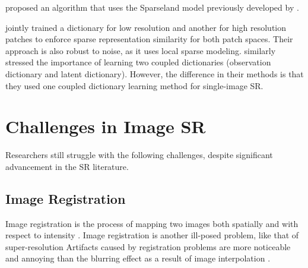 \cite{Zeyde2012} proposed an algorithm that uses the Sparseland model previously developed by \cite{Elad2006}. 

\cite{Wright2010} jointly trained a dictionary for low resolution and another for high resolution patches to enforce sparse representation similarity for both patch spaces. Their approach is also robust to noise, as it uses local sparse modeling.
\cite{Yang2012} similarly stressed the importance of learning two coupled dictionaries (observation dictionary and latent dictionary). However, the difference in their methods is that they used one coupled dictionary learning method for single-image SR. 	


%



\section{Challenges in Image SR}
Researchers still struggle with the following challenges, despite significant advancement in the SR literature.


\subsection{Image Registration}
Image registration is the process of mapping two images both spatially and with respect to intensity \citep{Brown1992}.
Image registration is another ill-posed problem, like that of super-resolution
Artifacts caused by registration problems are more noticeable and annoying than the blurring effect as a result of image interpolation \citep{Yang2010a}.
